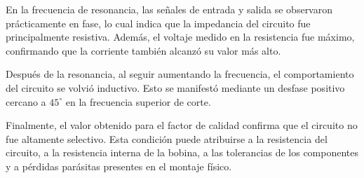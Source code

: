 En la frecuencia de resonancia, las señales de entrada y salida se observaron prácticamente en fase, lo cual indica que la impedancia del circuito fue principalmente resistiva. Además, el voltaje medido en la resistencia fue máximo, confirmando que la corriente también alcanzó su valor más alto.

Después de la resonancia, al seguir aumentando la frecuencia, el comportamiento del circuito se volvió inductivo. Esto se manifestó mediante un desfase positivo cercano a $45^\circ$ en la frecuencia superior de corte.

Finalmente, el valor obtenido para el factor de calidad confirma que el circuito no fue altamente selectivo. Esta condición puede atribuirse a la resistencia del circuito, a la resistencia interna de la bobina, a las tolerancias de los componentes y a pérdidas parásitas presentes en el montaje físico.